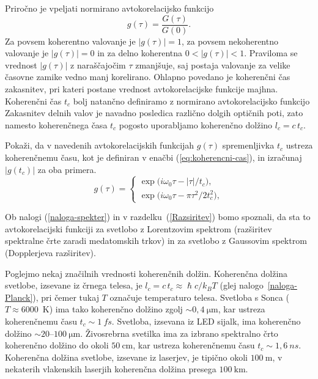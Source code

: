 Priročno je vpeljati normirano avtokorelacijsko funkcijo 
\begin{equation}
g(\tau)=\frac{G(\tau)}{G(0)}.
\label{eq:avtokorelacija-norm}
\end{equation}
Za povsem koherentno valovanje je $|g(\tau)|=1$, za povsem nekoherentno
valovanje je $|g(\tau)|=0$  in za delno koherentna $0<|g(\tau)|<1$.
Praviloma se vrednost $|g(\tau)|$ z naraščajočim $\tau$ zmanjšuje,
saj postaja valovanje za velike časovne zamike vedno manj korelirano.
Ohlapno povedano je koherenčni čas zakasnitev, pri kateri postane
vrednost avtokorelacijske funkcije majhna.
Koherenčni čas $t_{c}$ bolj natančno definiramo 
z normirano avtokorelacijsko funkcijo
Zakasnitev delnih valov je navadno posledica
različno dolgih optičnih poti, zato namesto koherenčnega časa $t_c$
pogosto uporabljamo koherenčno dolžino $l_{c}=c\,t_{c}$. 

\begin{definition}
Pokaži, da v navedenih avtokorelacijskih
funkcijah $g(\tau)$ spremenljivka $t_{c}$ ustreza koherenčnemu času,
kot je definiran v enačbi (\ref{eq:koherencni-cas}), in izračunaj $|g(t_{c})|$ za oba primera.
\begin{equation}
g(\tau)=\begin{cases}
\exp\big(i\omega_{0}\tau-\left|\tau\right|/t_{c}\big),\\
\exp\big(i\omega_{0}\tau-\pi\tau^{2}/2t_{c}^{2}\big),
\end{cases}
\label{eq:gauss-eksponent}
\end{equation}

Ob nalogi (\ref{naloga-spekter}) in v razdelku~(\ref{Razsiritev}) 
bomo spoznali, da sta to avtokorelacijski
funkciji za svetlobo z Lorentzovim spektrom
(razširitev spektralne črte zaradi medatomskih trkov) in za svetlobo z Gaussovim spektrom
(Dopplerjeva razširitev).
\end{definition}

Poglejmo nekaj značilnih vrednosti koherenčnih dolžin. 
Koherenčna dolžina svetlobe, izsevane iz črnega telesa, je 
$l_{c}=c\,t_{c}\approx \hslash c/k_{B}T$ (glej nalogo~\ref{naloga-Planck}), pri 
čemer tukaj $T$ označuje temperaturo telesa. 
Svetloba s Sonca ($T \approx 6000$~K)
ima tako koherenčno dolžino zgolj $\sim 0,4~\si{\micro\metre}$, kar ustreza
koherenčnemu času $t_c \sim 1~\si{fs}$. Svetloba,
izsevana iz LED sijalk, ima koherenčno dolžino $\sim20$--$100~\si{\micro\metre}$.
Živosrebrna svetilka ima za izbrano spektralno črto koherenčno dolžino
do okoli $50~\si{\centi\metre}$, kar ustreza koherenčnemu času $t_c \sim 1,6~\si{ns}$.
Koherenčna dolžina svetlobe, izsevane iz laserjev, je tipično okoli $100~\si{\metre}$, 
v nekaterih vlakenskih laserjih koherenčna dolžina 
presega $100~\si{\kilo\metre}$.

